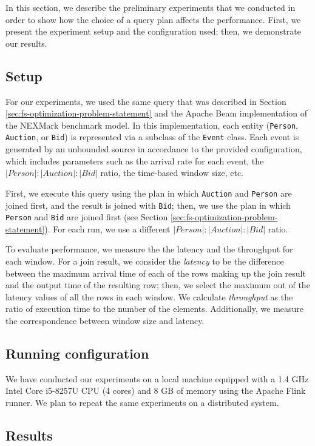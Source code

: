 \label {sec:fs-optimization-experiments}
In this section, we describe the preliminary experiments that we conducted in order to show how the choice of a query plan affects the performance. First, we present the experiment setup and the configuration used; then, we demonstrate our results.

\subsection{Setup}

For our experiments, we used the same query that was described in Section \ref{sec:fs-optimization-problem-statement} and the Apache Beam implementation of the NEXMark benchmark model. In this implementation, each entity (\texttt{Person}, \texttt{Auction}, or \texttt{Bid}) is represented via a subclass of the \texttt{Event} class. Each event is generated by an unbounded source in accordance to the provided configuration, which includes parameters such as the arrival rate for each event, the $|Person|:|Auction|:|Bid|$ ratio, the time-based window size, etc. 

First, we execute this query using the plan in which \texttt{Auction} and \texttt{Person} are joined first, and the result is joined with \texttt{Bid}; then, we use the plan in which \texttt{Person} and \texttt{Bid} are joined first (see Section  \ref{sec:fs-optimization-problem-statement}). For each run, we use a different $|Person|:|Auction|:|Bid|$ ratio.

To evaluate performance, we measure the the latency and the throughput for each window. For a join result, we consider the \textit{latency} to be the difference between the maximum arrival time of each of the rows making up the join result and the output time of the resulting row; then, we select the maximum out of the latency values of all the rows in each window. We calculate \textit{throughput} as the ratio of execution time to the number of the elements. Additionally, we measure the correspondence between window size and latency.

\subsection{Running configuration}
We have conducted our experiments on a local machine equipped with a 1.4 GHz Intel Core i5-8257U CPU (4 cores) and 8 GB of memory using the Apache Flink runner. We plan to repeat the same experiments on a distributed system.

\subsection{Results}

